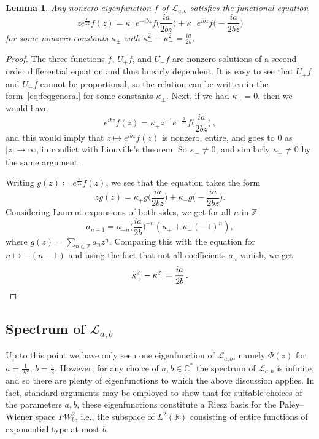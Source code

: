 \documentclass[12pt]{amsart}
\theoremstyle{plain}
\newtheorem{lemma}[theorem]{Lemma}
\numberwithin{equation}{section}
\theoremstyle{definition}
\newcommand{\Z}{\mathbb{Z}}
\newcommand{\C}{\mathbb{C}}
\newcommand{\Cone}{\mathscr{C}}
\begin{document}
\begin{lemma} \label{lem:feqgeneral}
	Any nonzero eigenfunction $f$ of $\mathcal{L}_{a,b}$ satisfies the functional equation
	\begin{equation} \label{eq:feqgeneral}
	ze^{\frac{a}{2z}}f(z) = \kappa_{+}e^{-i bz}f\Big(\frac{ia}{2bz}\Big) + \kappa_{-}e^{i bz}f\Big(-\frac{ia}{2bz}\Big)
	\end{equation}
	for some nonzero constants $\kappa_{\pm}$ with $\kappa_{+}^2-\kappa_{-}^2=\frac{ia}{2b}$.
\end{lemma}
\begin{proof}
	The three functions $f$, $U_{+}f$, and $U_{-}f$ are nonzero solutions of a second order differential equation and thus linearly dependent. It is easy to see that $U_{+}f$ and $U_{-}f$ cannot be proportional, so the relation can be written in the form~\eqref{eq:feqgeneral} for some constants $\kappa_{\pm}$. Next, if we had $\kappa_{-}=0$, then we would have
		\[e^{i bz}f(z) = \kappa_{+}z^{-1}e^{-\frac{a}{2z}}f\Big(\frac{ia}{2bz}\Big)\,,\]
	and this would imply that $z\mapsto e^{ibz}f(z)$ is nonzero, entire, and goes to $0$ as $|z|\to\infty$, in conflict with Liouville's theorem. So $\kappa_{-}\ne0$, and similarly $\kappa_{+}\ne0$ by the same argument.

	Writing $g(z)\coloneqq e^{\frac{a}{2z}}f(z)$, we see that the equation takes the form
	\[zg(z) = \kappa_{+}g\Big(\frac{ia}{2bz}\Big) + \kappa_{-}g\Big(-\frac{ia}{2bz}\Big).\]
	Considering Laurent expansions of both sides, we get for all $n$ in $\Z$
	\[ a_{n-1} = a_{-n}\Big(\frac{ia}{2b}\Big)^{-n}(\kappa_{+}+\kappa_{-}(-1)^n),\]
	where $g(z)=\sum_{n\in \Z}a_nz^n$. Comparing this with the equation for $n\mapsto-(n-1)$ and using the fact that not all coefficients $a_n$ vanish, we get
	\begin{equation} \label{eq:involution} 
	\kappa_{+}^2-\kappa_{-}^2=\frac{ia}{2b}\,.\qedhere
	\end{equation}
\end{proof}

\subsection{Spectrum of \texorpdfstring{$\mathcal{L}_{a,b}$}{L_{a,b}}}
\label{sec:spectrum}
Up to this point we have only seen one eigenfunction of $\mathcal{L}_{a,b}$, namely $\Phi(z)$  for $a=\frac{1}{2\Cone}$, $b=\frac{\pi}2$. However, for any choice of $a,b\in\C^{*}$ the spectrum of $\mathcal{L}_{a,b}$ is infinite, and so there are plenty of eigenfunctions to which the above discussion applies. In fact, standard arguments may be employed to show that for suitable choices of the parameters $a,b$, these eigenfunctions constitute a Riesz basis for the Paley--Wiener space $PW^2_b$, i.e., the subspace of $L^2(\mathbb R)$ consisting of entire functions of exponential type at most $b$.
\end{document}
